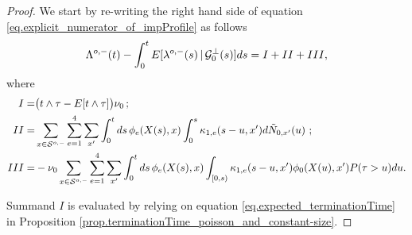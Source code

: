 \documentclass[10pt, article,table]{article}
\begin{document}
\begin{proof}
We start by re-writing the right hand side of equation \eqref{eq.explicit_numerator_of_impProfile} as follows
\begin{equation}\label{eq.proof_implementation_one-sided_impact}
 \Lambda^{o,-}(t) - \int_{0}^{t} {{E}}[\lambda_{}^{o,-}(s)\,\vert\,\mathcal{G}_{0}^{\perp}(s)]ds
 = I + II + III,
\end{equation}
where
\begin{equation*}
\begin{split}
 I =& 
 \big(t\wedge \tau - {{E}} [t\wedge\tau] \big) \nu_{0} \, ;
 \\
 II =&
 \sum_{x\in\mathcal{S}^{o,-}}\sum_{e=1}^{4}\sum_{x^{\prime}}
 \int_{0}^{t}  ds \, \phi_{e}(X(s),x)
 \int_{0}^{s}\kappa_{1,e}(s-u,x^{\prime}) 
 d\tilde{N}_{0,x^{\prime}}(u)\,\, ;
 \\
 III = &
 -\nu_{0}\sum_{x\in\mathcal{S}^{o,-}}\sum_{e=1}^{4}\sum_{x^{\prime}}
 \int_{0}^{t} ds \, \phi_{e}(X(s),x)
 \int_{[0,s)}
 \kappa_{1,e} (s-u,x^{\prime}) \phi_0(X(u),x^{\prime}){{P}}(\tau>u) du.
\end{split}
\end{equation*}

Summand $I$ is evaluated by relying on equation \eqref{eq.expected_terminationTime} in  Proposition \ref{prop.terminationTime_poisson_and_constant-size}. 


\end{proof}
\end{document}
